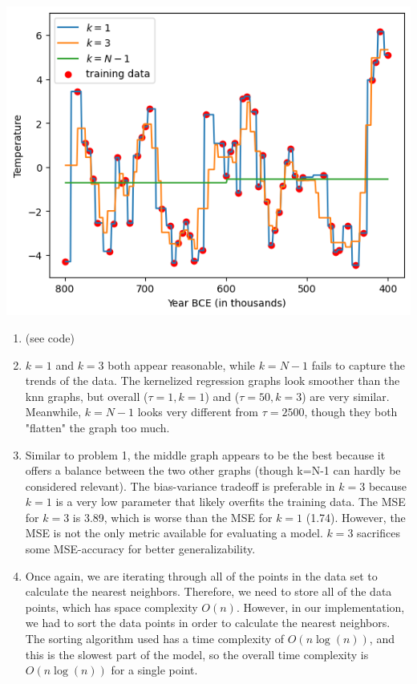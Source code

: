 \documentclass[submit]{harvardml}
\begin{document}
\newpage
\begin{solution}

\noindent
\begin{center}
  \includegraphics[width=0.5\linewidth]{Problem2.png}
\end{center}

\begin{enumerate}
  \item (see code)
  \item $k=1$ and $k=3$ both appear reasonable, while $k=N-1$ fails
  to capture the trends of the data. The kernelized regression graphs
  look smoother than the knn graphs, but overall ($\tau=1, k=1$) and ($\tau=50, k=3$)
  are very similar. Meanwhile, $k=N-1$ looks very different from $\tau=2500$,
  though they both "flatten" the graph too much.
  \item Similar to problem 1, the middle graph appears to be the best
  because it offers a balance between the two other graphs (though k=N-1 can
  hardly be considered relevant). The bias-variance tradeoff is preferable in
  $k=3$ because $k=1$ is a very low parameter that likely overfits the training data.
  The MSE for $k=3$ is 3.89, which is worse than the MSE for $k=1$ (1.74).
  However, the MSE is not the only metric available for evaluating a model.
  $k=3$ sacrifices some MSE-accuracy for better generalizability.
  \item Once again, we are iterating through all of the points in
  the data set to calculate the nearest neighbors. Therefore, we need
  to store all of the data points, which has space complexity $O(n)$. However, in our implementation,
  we had to sort the data points in order to calculate the nearest neighbors.
  The sorting algorithm used has a time complexity of $O(n\log(n))$, and this is
  the slowest part of the model, so the overall time complexity is $O(n\log(n))$ for
  a single point.

\end{enumerate}

\end{solution}
\end{document}
